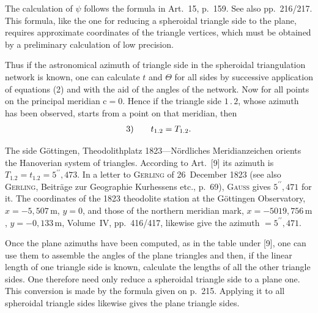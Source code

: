 \par\noindent\hspace*{\parindent}The calculation of $\psi$ follows the formula in Art.~15, p.~159.
See also pp.~216/217. This formula, like the one for reducing a spheroidal
triangle side to the plane, requires approximate coordinates of the
triangle vertices, which must be obtained by a preliminary calculation
of low precision.

\par\noindent\hspace*{\parindent}Thus if the astronomical azimuth of  triangle side
in the spheroidal triangulation network is known, one can calculate $t$
and $\Theta$ for all sides by successive application of equations (2)
and with the aid of the angles of the network. Now for all points on the
principal meridian $\mathrm{c}=0$. Hence if the triangle side $1\,.\,2$,
whose azimuth has been observed, starts from a point on that meridian, then
\[
\begin{array}{r@{\qquad}c}
3)&t_{1.2}=T_{1.2}.
\end{array}
\]

\par\noindent\hspace*{\parindent}The side Göttingen, Theodolithplatz 1823---Nördliches Meridianzeichen
orients the Hanoverian system of triangles. According to Art.~[9]
its azimuth is $T_{1.2}=t_{1.2}=5^{\prime\prime}{,}473$.
In a letter to \textsc{Gerling} of 26~December 1823 (see also \textsc{Gerling},
Beiträge zur Geographie Kurhessens etc., p.~69), \textsc{Gauss} gives
$5^{\prime\prime}{,}471$ for it. The coordinates of the 1823 theodolite
station at the Göttingen Observatory, $x=-5{,}507\,\mathrm{m}$, $y=0$, and
those of the northern meridian mark, $x=-5019{,}756\,\mathrm{m}$,
$y=-0{,}133\,\mathrm{m}$, Volume~IV, pp.~416/417, likewise give the azimuth
$=5^{\prime\prime}{,}471$.

\par\noindent\hspace*{\parindent}Once the plane azimuths have been computed, as in the table under [9],
one can use them to assemble the angles of the plane triangles and then,
if the linear length of one triangle side is known, calculate the lengths
of all the other triangle sides. One therefore need only 
reduce a spheroidal triangle side to a plane one. This conversion is made
by the formula given on p.~215. Applying it to all spheroidal triangle
sides likewise gives the plane triangle sides.


